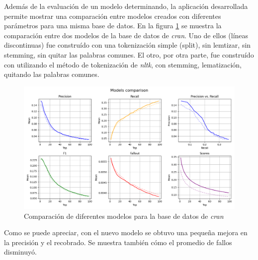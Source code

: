 Además de la evaluación de un modelo determinando, la aplicación desarrollada
permite mostrar una comparación entre modelos creados con diferentes
parámetros para una misma base de datos. En la figura \ref{fig:cran-comp} se muestra
la comparación entre dos modelos de la base de datos de \emph{cran}. Uno de ellos
(líneas discontinuas) fue construído con una tokenización simple (split), sin
lemtizar, sin stemming, sin quitar las palabras comunes. El otro, por otra parte,
fue construído con utilizando el método de tokenización de \emph{nltk}, con
stemming, lematización, quitando las palabras comunes.

\begin{figure}[htb]%
	\begin{center}
		\includegraphics[width=1.0\textwidth]{./cran_comp.png}
	\end{center}
	\caption{Comparación de diferentes modelos para la base de datos de \emph{cran}}
	\label{fig:cran-comp}
\end{figure}

Como se puede apreciar, con el nuevo modelo se obtuvo una pequeña mejora en la
precisión y el recobrado. Se muestra también cómo el promedio de fallos disminuyó.
